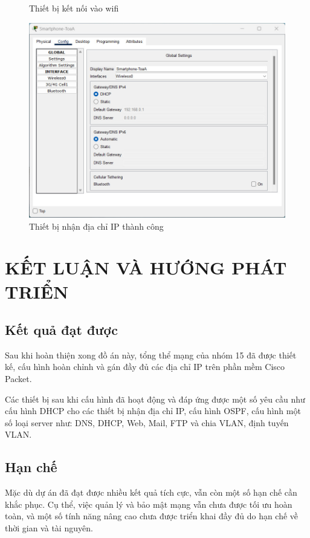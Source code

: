 \documentclass[12pt, a4paper]{article}
\begin{document}
\begin{flushleft}
\begin{figure}[H]
			\caption{Thiết bị kết nối vào wifi}  
			\includegraphics[width=1\textwidth]{test-wifi-2.jpg}
			\caption{Thiết bị nhận địa chỉ IP thành công}
		\end{figure}
	\end{flushleft}
	\newpage
	\section{KẾT LUẬN VÀ HƯỚNG PHÁT TRIỂN}
	\subsection{Kết quả đạt được}
	\hspace{1.5cm}Sau khi hoàn thiện xong đồ án này, tổng thể mạng của nhóm 15 đã được thiết kế, cấu hình hoàn chỉnh và gán đầy đủ các địa chỉ IP trên phần mềm Cisco Packet.
	\par
	\hspace{0.9cm}Các thiết bị sau khi cấu hình đã hoạt động và đáp ứng được một số yêu cầu như cấu hình DHCP cho các thiết bị nhận địa chỉ IP, cấu hình OSPF, cấu hình một số loại server như: DNS, DHCP, Web, Mail, FTP và chia VLAN, định tuyến VLAN.
	
	\subsection{Hạn chế}
	\hspace{1.5cm}Mặc dù dự án đã đạt được nhiều kết quả tích cực, vẫn còn một số hạn chế cần khắc phục. Cụ thể, việc quản lý và bảo mật mạng vẫn chưa được tối ưu hoàn toàn, và một số tính năng nâng cao chưa được triển khai đầy đủ do hạn chế về thời gian và tài nguyên.
	
\end{document}
